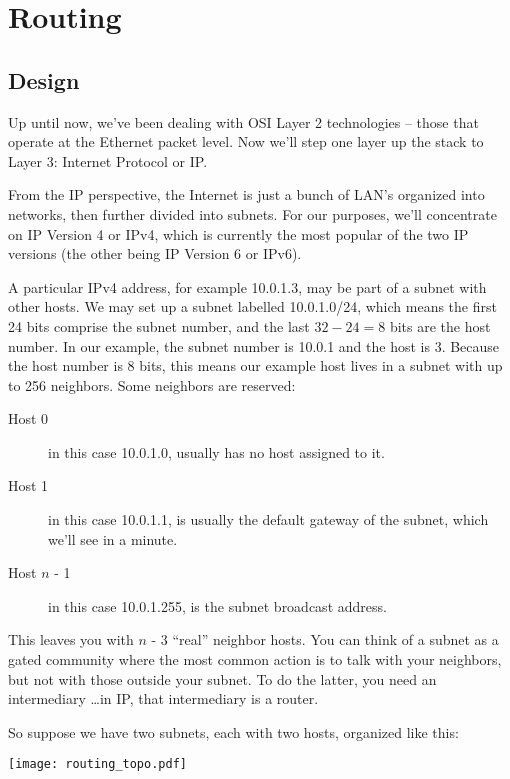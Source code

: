
\chapter{Routing}

\section{Design}
\label{routing:design}

Up until now, we've been dealing with OSI Layer 2 technologies -- those that operate at the
Ethernet packet level.  Now we'll step one layer up the stack to Layer 3: Internet Protocol
or IP.  

From the IP perspective, the Internet is just a bunch of LAN's organized into networks, 
then further divided into subnets.  For our purposes, we'll concentrate on
IP Version 4 or IPv4, which is currently the most popular of the two IP versions (the other being
IP Version 6 or IPv6).  

A particular IPv4 address, for example 10.0.1.3, may be part of a subnet
with other hosts.  We may set up a subnet labelled 10.0.1.0/24, which means the first 24 bits
comprise the subnet number, and the last $32 - 24 = 8$ bits are the host number.  In our example, the
subnet number is 10.0.1 and the host is 3.  Because the host number is 8 bits, this means our example
host lives in a subnet with up to 256 neighbors.  Some neighbors are reserved:

\begin{description}
\item[Host 0] in this case 10.0.1.0, usually has no host assigned to it. 
\item[Host 1] in this case 10.0.1.1, is usually the default gateway of the subnet, which we'll see in 
a minute.
\item[Host $n$ - 1] in this case 10.0.1.255, is the subnet broadcast address.
\end{description}

This leaves you with $n$ - 3 ``real'' neighbor hosts.  You can think of a subnet as a gated community
where the most common action is to talk with your neighbors, but not with those outside your
subnet.  To do the latter, you need an intermediary \ldots in IP, that intermediary is a router.

So suppose we have two subnets, each with two hosts, organized like this:

\texttt{[image: routing\_topo.pdf]}

